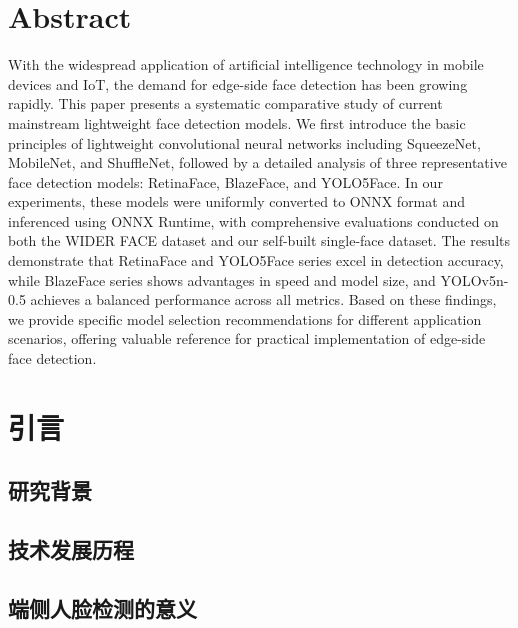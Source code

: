 \documentclass{article}
\begin{document}
\section*{Abstract}
With the widespread application of artificial intelligence technology in mobile devices and IoT, the demand for edge-side face detection has been growing rapidly. This paper presents a systematic comparative study of current mainstream lightweight face detection models. We first introduce the basic principles of lightweight convolutional neural networks including SqueezeNet, MobileNet, and ShuffleNet, followed by a detailed analysis of three representative face detection models: RetinaFace, BlazeFace, and YOLO5Face. In our experiments, these models were uniformly converted to ONNX format and inferenced using ONNX Runtime, with comprehensive evaluations conducted on both the WIDER FACE dataset and our self-built single-face dataset. The results demonstrate that RetinaFace and YOLO5Face series excel in detection accuracy, while BlazeFace series shows advantages in speed and model size, and YOLOv5n-0.5 achieves a balanced performance across all metrics. Based on these findings, we provide specific model selection recommendations for different application scenarios, offering valuable reference for practical implementation of edge-side face detection.

\vfill %

\clearpage

\thispagestyle{empty}
\hypersetup{linkcolor=black}
\tableofcontents
\hypersetup{linkcolor=blue}
\newpage


\setcounter{page}{1}

\section{引言}
\subsection{研究背景}
\subsection{技术发展历程}
\subsection{端侧人脸检测的意义}
\clearpage
\end{document}
